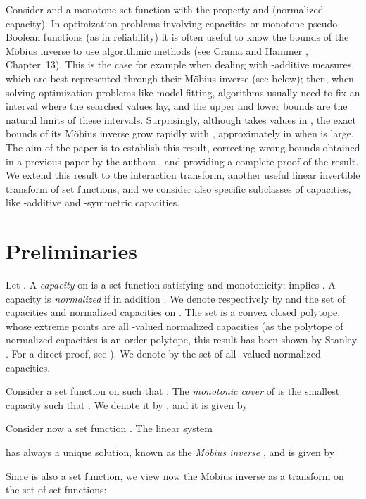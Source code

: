 \documentclass[12pt,a4paper]{article}
\theoremstyle{definition}
\theoremstyle{remark}
\begin{document}
Consider  and a monotone set function
 with the property  and
 (normalized capacity).  In optimization problems involving capacities
or monotone pseudo-Boolean functions (as in reliability) it is often
useful to know the bounds of the M\"obius inverse to use algorithmic
  methods (see Crama and Hammer \cite{crha11}, Chapter~13). This is the case
for example when dealing with -additive measures, which are best represented
through their M\"obius inverse (see below); then, when solving optimization
problems like model fitting, algorithms usually need to fix an interval where
the searched values lay, and the upper and lower bounds are the natural limits
of these intervals. Surprisingly, although  takes values in , the
exact bounds of its M\"obius inverse grow rapidly with , approximately in
 when  is large. The aim of the paper is to
establish this result, correcting wrong bounds obtained in a previous paper by
the authors \cite{migr99a}, and providing a complete proof of the result. We
extend this result to the interaction transform, another useful linear
invertible transform of set functions, and we consider also specific subclasses
of capacities, like -additive and -symmetric capacities.

\section{Preliminaries}
Let . A \textit{capacity} on  is a set function
 satisfying  and monotonicity:
 implies . A capacity is
\textit{normalized} if in addition . We denote respectively by 
and  the set of capacities and normalized capacities on . The set
 is a convex closed polytope, whose extreme points are all
-valued normalized capacities (as the polytope of normalized capacities
is an order polytope, this result has been shown by Stanley \cite{sta86}. For a
direct proof, see \cite{rad98}). We denote by
 the set of all -valued normalized capacities.

Consider a set function  on  such that . The
\textit{monotonic cover} of  is the smallest capacity  such that
. We denote it by , and it is given by




Consider now a set function . The linear system

has always a unique solution, known as the \textit{M\"obius inverse}
\cite{rot64}, and is given by

Since  is also a set function, we view now the M\"obius inverse as a transform on
the set of set functions:
\end{document}
